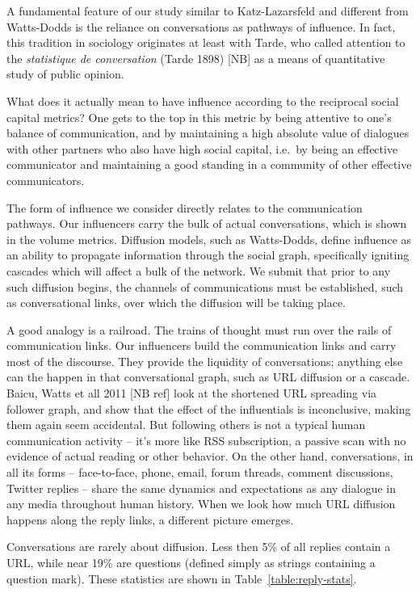 \documentclass[10pt,oneside]{memoir}
\begin{document}
A fundamental feature of our study similar to Katz-Lazarsfeld and different from Watts-Dodds is the reliance on conversations as pathways of influence.  In fact, this tradition in sociology originates at least with Tarde, who called attention to  the \emph{statistique de conversation} (Tarde 1898) [NB] as a means of quantitative study of public opinion.


What does it actually mean to have influence according to the reciprocal social capital metrics?  One gets to the top in this metric by being attentive to one's balance of communication, and by maintaining a high absolute value of dialogues with other partners who also have high social capital, i.e.\ by being an effective communicator and maintaining a good standing in a community of other effective communicators.


The form of influence we consider directly relates to the communication pathways.  Our influencers carry the bulk of actual conversations, which is shown in the volume metrics.  Diffusion models, such as Watts-Dodds, define influence as an ability to propagate information through the social graph, specifically igniting cascades which will affect a bulk of the network.  We submit that prior to any such diffusion begins, the channels of communications must be established, such as conversational links, over which the diffusion will be taking place.


A good analogy is a railroad.  The trains of thought must run over the rails of communication links. Our influencers build the communication links and carry most of the discourse.  They provide the liquidity of conversations; anything else can the happen in that conversational graph, such as URL diffusion or a cascade.   Baicu, Watts et all 2011 [NB ref] look at the shortened URL spreading via follower graph, and show that the effect of the influentials is inconclusive, making them again seem accidental.  But following others is not a typical human communication activity -- it's more like RSS subscription, a passive scan with no evidence of actual reading or other behavior.  On the other hand, conversations, in all its forms -- face-to-face, phone, email, forum threads,  comment discussions, Twitter replies -- share the same dynamics and expectations as any dialogue in any media throughout human history.  When we look how much URL diffusion happens along the reply links, a different picture emerges.


Conversations are rarely about diffusion.  Less then 5\% of all replies contain a URL, while near 19\% are questions (defined simply as strings containing a question mark).  These statistics are shown in Table~\ref{table:reply-stats}.
\end{document}
